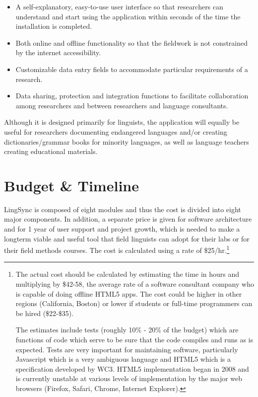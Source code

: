 \documentclass[12pt]{article}
\begin{document}
\begin{itemize} 
\item A self-explanatory, easy-to-use user interface so that researchers can understand and start using the application  within seconds of  the time the installation is completed.  
\item Both online and offline functionality so that the fieldwork is not constrained by the internet accessibility. 
\item Customizable data entry fields to accommodate particular requirements of a research.  
\item Data sharing, protection and integration functions to facilitate collaboration among researchers and between researchers and language consultants. 

\end{itemize} 


Although it is designed primarily for linguists, the application will equally be useful for researchers documenting endangered languages and/or creating dictionaries/grammar books for minority languages, as well as language teachers creating educational materials.  





\section {Budget \& Timeline}

LingSync is composed of eight modules and thus the cost is divided into eight major components. In addition, a separate price is given for software architecture and for 1 year of user support and project growth, which is needed to make a longterm viable and useful tool that field linguists can adopt for their labs or for their field methods courses. The cost is calculated using a rate of \$25/hr.\footnote{The actual cost should be calculated by estimating the time in hours and multiplying by \$42-58, the average rate of a software consultant company who is capable of doing offline HTML5 apps. The cost could be higher in other regions (California, Boston) or lower if students or full-time programmers can be hired (\$22-\$35).  

The  estimates include tests (roughly 10\% - 20\% of the budget) which are functions of code which serve to be sure that the code compiles and runs as is expected. Tests are very important for maintaining software, particularly Javascript which is a very ambiguous language and HTML5 which is a specification developed by WC3. HTML5 implementation  began in 2008 and is currently unstable at various levels of implementation by the major web browsers (Firefox, Safari, Chrome, Internet Explorer).}
\end{document}
